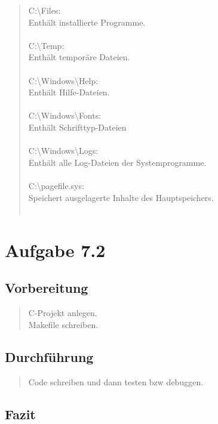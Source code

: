 \begin{quote}
			C:\textbackslash Files:\\
			Enth\"alt  installierte Programme.\\ \\
			C:\textbackslash Temp:\\
			Enth\"alt  tempor\"are Dateien.\\ \\
			C:\textbackslash Windows\textbackslash Help:\\
			Enth\"alt  Hilfe-Dateien.\\ \\
			C:\textbackslash Windows\textbackslash Fonts:\\
			Enth\"alt  Schrifttyp-Dateien\\ \\
			C:\textbackslash Windows\textbackslash Logs:\\
			Enth\"alt alle Log-Dateien der Systemprogramme.\\ \\
			C:\textbackslash pagefile.sys:\\
			Speichert ausgelagerte Inhalte des Hauptspeichers.\\ \\
		\end{quote}

\section{Aufgabe 7.2}
	\subsection{Vorbereitung}
		\begin{quote}
			C-Projekt anlegen.\\
			Makefile schreiben.\\
		\end{quote}
	\subsection{Durchführung}
		\begin{quote}
			Code schreiben und dann testen bzw debuggen.\\
		\end{quote}
	\subsection{Fazit}
		\begin{quote}
			
		\end{quote}